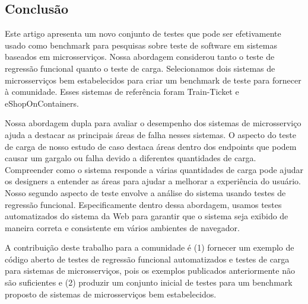 \begin{tabela}[h]
\begin{tabela}[!t]
\begin{tabela}[h]
\begin{tabela}[h]
\section{Conclusão}
\label{sec:conclusão}

Este artigo apresenta um novo conjunto de testes que pode ser efetivamente usado como benchmark para pesquisas sobre teste de software em sistemas baseados em microsserviços. Nossa abordagem considerou tanto o teste de regressão funcional quanto o teste de carga. Selecionamos dois sistemas de microsserviços bem estabelecidos para criar um benchmark de teste para fornecer à comunidade. Esses sistemas de referência foram Train-Ticket e eShopOnContainers.

Nossa abordagem dupla para avaliar o desempenho dos sistemas de microsserviço ajuda a destacar as principais áreas de falha nesses sistemas. O aspecto do teste de carga de nosso estudo de caso destaca áreas dentro dos endpoints que podem causar um gargalo ou falha devido a diferentes quantidades de carga. Compreender como o sistema responde a várias quantidades de carga pode ajudar os designers a entender as áreas para ajudar a melhorar a experiência do usuário. Nosso segundo aspecto de teste envolve a análise do sistema usando testes de regressão funcional. Especificamente dentro dessa abordagem, usamos testes automatizados do sistema da Web para garantir que o sistema seja exibido de maneira correta e consistente em vários ambientes de navegador.

A contribuição deste trabalho para a comunidade é (1) fornecer um exemplo de código aberto de testes de regressão funcional automatizados e testes de carga para sistemas de microsserviços, pois os exemplos publicados anteriormente não são suficientes e (2) produzir um conjunto inicial de testes para um benchmark proposto de sistemas de microsserviços bem estabelecidos.%

    
    

\end{tabela}
\end{tabela}
\end{tabela}
\end{tabela}
